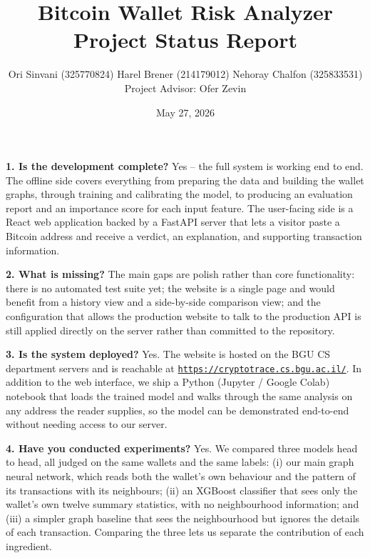 \documentclass[11pt]{article}
\title{\vspace{-1.2cm}Bitcoin Wallet Risk Analyzer\\[2pt]\large Project Status Report}
\author{Ori Sinvani \textnormal{(325770824)} \quad Harel Brener \textnormal{(214179012)} \quad Nehoray Chalfon \textnormal{(325833531)}\\[3pt]
\normalsize\normalfont Project Advisor: Ofer Zevin}
\date{May 27, 2026}
\begin{document}
\maketitle
\vspace{-1.0cm}

\noindent\textbf{1. Is the development complete?}\quad
Yes -- the full system is working end to end. The offline side covers everything from preparing
the data and building the wallet graphs, through training and calibrating the model, to producing
an evaluation report and an importance score for each input feature. The user-facing side is a
React web application backed by a FastAPI server that lets a visitor paste a Bitcoin address and
receive a verdict, an explanation, and supporting transaction information.

\noindent\textbf{2. What is missing?}\quad
The main gaps are polish rather than core functionality: there is no automated test suite yet;
the website is a single page and would benefit from a history view and a side-by-side comparison
view; and the configuration that allows the production website to talk to the production API is
still applied directly on the server rather than committed to the repository.

\noindent\textbf{3. Is the system deployed?}\quad
Yes. The website is hosted on the BGU CS department servers and is reachable at
\href{https://cryptotrace.cs.bgu.ac.il/}{\texttt{https://cryptotrace.cs.bgu.ac.il/}}. In
addition to the web interface, we ship a Python (Jupyter / Google Colab) notebook that loads the
trained model and walks through the same analysis on any address the reader supplies, so the
model can be demonstrated end-to-end without needing access to our server.

\noindent\textbf{4. Have you conducted experiments?}\quad
Yes. We compared three models head to head, all judged on the same wallets and the same
labels: (i) our main graph neural network, which reads both the wallet's own behaviour and the
pattern of its transactions with its neighbours; (ii) an XGBoost classifier that sees only the
wallet's own twelve summary statistics, with no neighbourhood information; and (iii) a simpler
graph baseline that sees the neighbourhood but ignores the details of each transaction. Comparing
the three lets us separate the contribution of each ingredient.
\end{document}
